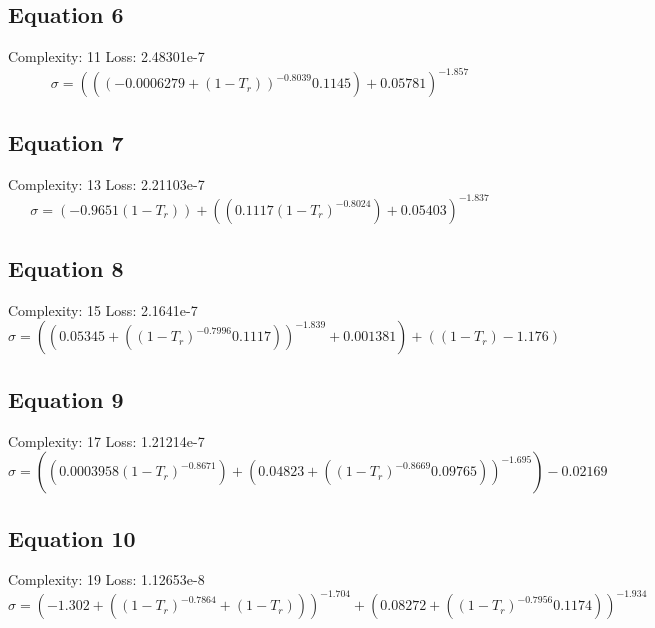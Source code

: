 \documentclass[11pt]{article}
\begin{document}
\subsection*{Equation 6}
\noindent Complexity: 11 \quad Loss: 2.48301e-7 \\[4pt]
\[
\sigma = \left((\left(-0.0006279 + (1 - T_r)\right)^{-0.8039} 0.1145) + 0.05781\right)^{-1.857}
\]

\subsection*{Equation 7}
\noindent Complexity: 13 \quad Loss: 2.21103e-7 \\[4pt]
\[
\sigma = (-0.9651 (1 - T_r)) + \left((0.1117 \left(1 - T_r\right)^{-0.8024}) + 0.05403\right)^{-1.837}
\]

\subsection*{Equation 8}
\noindent Complexity: 15 \quad Loss: 2.1641e-7 \\[4pt]
\[
\sigma = (\left(0.05345 + (\left(1 - T_r\right)^{-0.7996} 0.1117)\right)^{-1.839} + 0.001381) + ((1 - T_r) -1.176)
\]

\subsection*{Equation 9}
\noindent Complexity: 17 \quad Loss: 1.21214e-7 \\[4pt]
\[
\sigma = ((0.0003958 \left(1 - T_r\right)^{-0.8671}) + \left(0.04823 + (\left(1 - T_r\right)^{-0.8669} 0.09765)\right)^{-1.695}) - 0.02169
\]

\subsection*{Equation 10}
\noindent Complexity: 19 \quad Loss: 1.12653e-8 \\[4pt]
\[
\sigma = \left(-1.302 + (\left(1 - T_r\right)^{-0.7864} + (1 - T_r))\right)^{-1.704} + \left(0.08272 + (\left(1 - T_r\right)^{-0.7956} 0.1174)\right)^{-1.934}
\]
\end{document}
